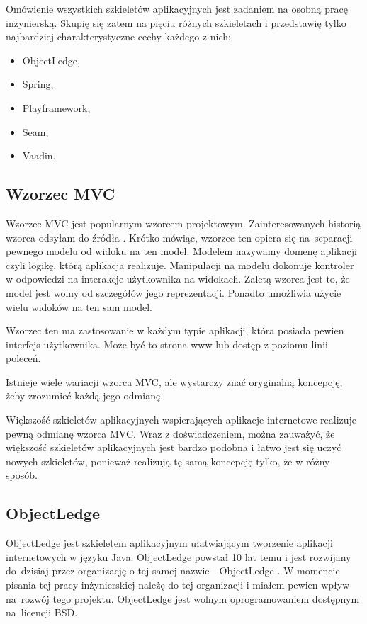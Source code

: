 \documentclass[a4paper,onecolumn,oneside,11pt,wide,floatssmall]{mwrep}
\theoremstyle{definition}
\theoremstyle{plain}%
\theoremstyle{remark}
\begin{document}
Omówienie wszystkich szkieletów aplikacyjnych jest zadaniem na osobną pracę inżynierską. Skupię się zatem na pięciu różnych szkieletach i przedstawię tylko najbardziej charakterystyczne cechy każdego z nich:
\begin{itemize}
  \item ObjectLedge,
  \item Spring,
  \item Playframework,
  \item Seam,
  \item Vaadin.
\end{itemize}

\subsection{Wzorzec MVC}
\label{wzorzec-mvc}
Wzorzec MVC jest popularnym wzorcem projektowym. Zainteresowanych historią wzorca odsyłam do źródła \cite{mvcHistory}. Krótko mówiąc, wzorzec ten opiera się \mbox{na separacji} pewnego modelu od widoku na ten model. Modelem nazywamy domenę aplikacji czyli logikę, którą aplikacja realizuje. Manipulacji na modelu dokonuje kontroler w odpowiedzi na interakcje użytkownika na widokach. Zaletą wzorca jest to, że model jest wolny od szczegółów jego reprezentacji. Ponadto umożliwia użycie wielu widoków na ten sam model.

Wzorzec ten ma zastosowanie w każdym typie aplikacji, która posiada pewien interfejs użytkownika. Może być to strona www lub dostęp z poziomu linii poleceń.

Istnieje wiele wariacji wzorca MVC, ale wystarczy znać oryginalną koncepcję, żeby zrozumieć każdą jego odmianę.

Większość szkieletów aplikacyjnych wspierających aplikacje internetowe realizuje pewną odmianę wzorca MVC. Wraz z doświadczeniem, można zauważyć, że większość szkieletów aplikacyjnych jest bardzo podobna i łatwo jest się uczyć nowych szkieletów, ponieważ realizują tę samą koncepcję tylko, że w różny sposób.

\subsection{ObjectLedge}
ObjectLedge jest szkieletem aplikacyjnym ułatwiającym tworzenie aplikacji internetowych w języku Java. ObjectLedge powstał 10 lat temu i jest rozwijany \mbox{do dzisiaj} przez organizację o tej samej nazwie - ObjectLedge \cite{objectLedgeOrgHome}. W momencie pisania tej pracy inżynierskiej należę do tej organizacji i miałem pewien wpływ \mbox{na rozwój} tego projektu. ObjectLedge jest wolnym oprogramowaniem dostępnym \mbox{na licencji} BSD.
\end{document}
